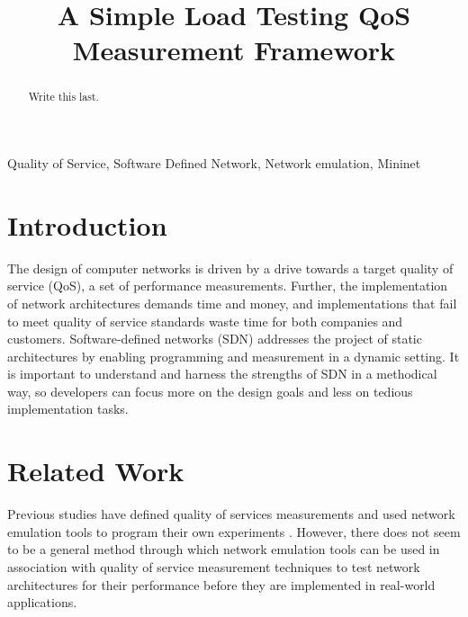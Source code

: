 \documentclass{article}
\title{A Simple Load Testing QoS Measurement Framework}
\begin{document}
%
\maketitle
%
\begin{abstract}
Write this last.
\end{abstract}
%
\begin{keywords}
Quality of Service, Software Defined Network, Network emulation, Mininet
\end{keywords}
%
\section{Introduction}
The design of computer networks is driven by a drive towards a target quality of service (QoS), a set of performance measurements. Further, the implementation of 
network architectures demands time and money, and implementations that fail to meet quality of service standards waste time for both companies and customers. 
Software-defined networks (SDN) addresses the project of static architectures by enabling programming and measurement in a dynamic setting. It is important to understand 
and harness the strengths of SDN in a methodical way, so developers can focus more on the design goals and less on tedious implementation tasks.

\section{Related Work}
Previous studies have defined quality of services measurements \cite{qos_analysis_2022} and used network emulation tools to program their own experiments 
\cite{chauhan_atulkar_2020}. However, there does not seem to be a general method through which network emulation tools can be used in association with quality 
of service measurement techniques to test network architectures for their performance before they are implemented in real-world applications.

\end{document}
